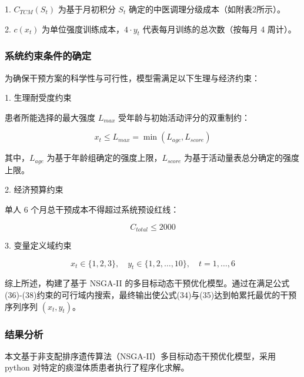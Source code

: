 \documentclass[12pt]{article}
\begin{document}
	{\songti{}
		1.  $C_{TCM}(S_t)$ 为基于月初积分 $S_t$ 确定的中医调理分级成本（如附表2所示）。
		\par}
	
	{\songti{}
		2.  $c(x_t)$ 为单位强度训练成本，$4 \cdot y_t$ 代表每月训练的总次数（按每月 4 周计）。
		\par}
	
	\subsubsection{系统约束条件的确定}
	{\songti{}
		为确保干预方案的科学性与可行性，模型需满足以下生理与经济约束：
		\par}
	
	{\songti{}
		1.  生理耐受度约束
		\par}
	
	{\songti{}
		患者所能选择的最大强度 $L_{max}$ 受年龄与初始活动评分的双重制约：
		\par}
	
	\begin{equation}
		x_t \le L_{max} = \min(L_{age}, L_{score})
	\end{equation}
	
	{\songti{}
		其中，$L_{age}$ 为基于年龄组确定的强度上限，$L_{score}$ 为基于活动量表总分确定的强度上限。
		\par}
	
	{\songti{}
		2.  经济预算约束
		\par}
	
	{\songti{}
		单人 6 个月总干预成本不得超过系统预设红线：
		\par}
	
	\begin{equation}
		C_{total} \le 2000
	\end{equation}
	
	{\songti{}
		3.  变量定义域约束
		\par}
	
	\begin{equation}
		x_t \in \{1,2,3\}, \quad y_t \in \{1,2,\dots,10\}, \quad t=1,\dots,6
	\end{equation}
	
	{\songti{}
		综上所述，构建了基于 NSGA-II 的多目标动态干预优化模型。通过在满足公式(36)-(38)约束的可行域内搜索，最终输出使公式(34)与(35)达到帕累托最优的干预序列序列 $(x_t, y_t)$。
		\par}
	
	\subsubsection{结果分析}
	{\songti{}
		本文基于非支配排序遗传算法（NSGA-II）多目标动态干预优化模型，采用 python 对特定的痰湿体质患者执行了程序化求解。
		\par}
		
\end{document}
